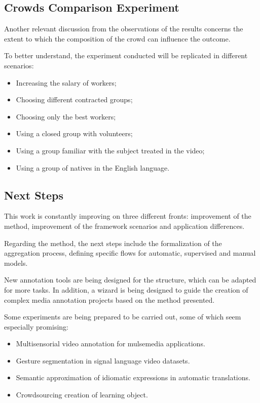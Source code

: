 \subsection{Crowds Comparison Experiment}
Another relevant discussion from the observations of the results concerns the extent to which the composition of the crowd can influence the outcome.

To better understand, the experiment conducted will be replicated in different scenarios:
\begin{itemize}
\item Increasing the salary of workers;
\item Choosing different contracted groups;
\item Choosing only the best workers;
\item Using a closed group with volunteers;
\item Using a group familiar with the subject treated in the video;
\item Using a group of natives in the English language.
\end{itemize}


\subsection{Next Steps}

This work is constantly improving on three different fronts: improvement of the method, improvement of the framework scenarios and application differences.

Regarding the method, the next steps include the formalization of the aggregation process, defining specific flows for automatic, supervised and manual models.

New annotation tools are being designed for the structure, which can be adapted for more tasks. In addition, a wizard is being designed to guide the creation of complex media annotation projects based on the method presented.

Some experiments are being prepared to be carried out, some of which seem especially promising:
\begin{itemize}
\item Multisensorial video annotation for mulsemedia applications.
\item Gesture segmentation in signal language video datasets.
\item Semantic approximation of idiomatic expressions in automatic translations.
\item Crowdsourcing  creation of learning object.
\end{itemize}
